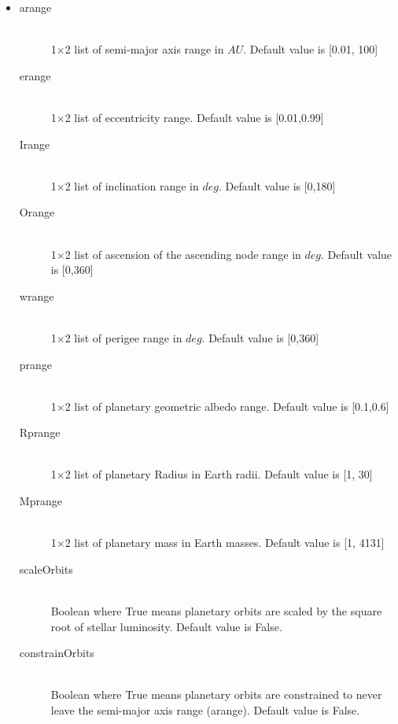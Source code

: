 \documentclass[cleanfoot]{asme2ej}
\begin{document}
\begin{itemize}
\item
\begin{description}
    \item[arange] \hfill \\
    1$\times$2 list of semi-major axis range in $ AU $. Default value is [0.01, 100]
    \item[erange] \hfill \\
    1$\times$2 list of eccentricity range.  Default value is [0.01,0.99]
    \item[Irange] \hfill \\
    1$\times$2 list of inclination range in $ deg $.  Default value is [0,180]
    \item[Orange] \hfill \\
    1$\times$2 list of ascension of the ascending node range in $ deg $.  Default value is [0,360]
    \item[wrange] \hfill \\
    1$\times$2 list of perigee range in $ deg $.  Default value is [0,360]
    \item[prange] \hfill \\
    1$\times$2 list of planetary geometric albedo range.  Default value is [0.1,0.6]
    \item[Rprange] \hfill \\
    1$\times$2 list of planetary Radius in Earth radii.  Default value is [1, 30]
    \item[Mprange] \hfill \\
    1$\times$2 list of planetary mass in Earth masses.  Default value is [1, 4131]
    \item [scaleOrbits] \hfill \\
    Boolean where True means planetary orbits are scaled by the square root of stellar luminosity. Default value is False.
    \item[constrainOrbits] \hfill \\
    Boolean where True means planetary orbits are constrained to never leave the semi-major axis range (arange). Default value is False.
\end{description}
\end{itemize}
\end{document}
